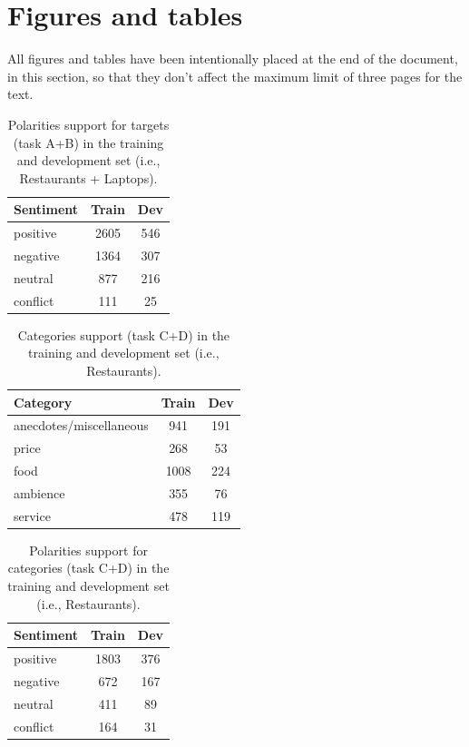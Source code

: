 \documentclass[11pt,a4paper]{article}
\begin{document}
	\clearpage
	\section{Figures and tables}
	All figures and tables have been intentionally placed at the end of the
	document, in this section, so that they don't affect the maximum limit of three
	pages for the text.
	
	\begin{table}[H]
		\centering
		\begin{tabular}{@{}lcc@{}}
			\toprule
			\textbf{Sentiment} & Train & Dev \\ \midrule
			positive           & 2605  & 546 \\
			negative           & 1364  & 307 \\
			neutral            & 877   & 216 \\
			conflict           & 111   & 25  \\ \bottomrule
		\end{tabular}
		\caption{Polarities support for targets (task A+B) in the training and
			development set (i.e., Restaurants + Laptops).}
		\label{tab:ab_polarities_support}
	\end{table}
	
	\begin{table}[H]
		\centering
		\begin{tabular}{@{}lcc@{}}
			\toprule
			\textbf{Category}         & Train     & Dev \\ \midrule
			anecdotes/miscellaneous   & 941       & 191     \\
			price                     & 268       & 53      \\
			food                      & 1008      & 224     \\
			ambience                  & 355       & 76      \\
			service                   & 478       & 119     \\ \bottomrule
		\end{tabular}
		\caption{Categories support (task C+D) in the training and development set
			(i.e., Restaurants).}
		\label{tab:cd_categories_support}
	\end{table}
	
	\begin{table}[H]
		\centering
		\begin{tabular}{@{}lcc@{}}
			\toprule
			\textbf{Sentiment} & Train & Dev \\ \midrule
			positive           & 1803  & 376 \\
			negative           & 672   & 167 \\
			neutral            & 411   & 89  \\
			conflict           & 164   & 31  \\ \bottomrule
		\end{tabular}
		\caption{Polarities support for categories (task C+D) in the training and
			development set (i.e., Restaurants).}
		\label{tab:cd_polarities_support}
	\end{table}
	
\end{document}
